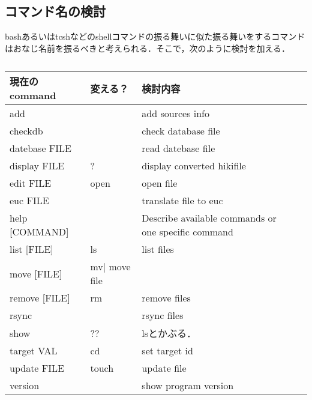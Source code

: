 \subsection{コマンド名の検討}
bashあるいはtcshなどのshellコマンドの振る舞いに似た振る舞いをするコマンドはおなじ名前を振るべきと考えられる．そこで，次のように検討を加える．

\begin{table}[htbp]\begin{center}
\caption{}
\begin{tabular}{llll}
\hline
現在のcommand  &変える？  &検討内容  \\ \hline
add               &  &add sources info  \\
checkdb           &  &check database file  \\
datebase FILE     &  &read datebase file  \\
display FILE      &?  &display converted hikifile  \\
edit FILE         &open  &open file  \\
euc FILE          &  &translate file to euc  \\
help [COMMAND]    &  &Describe available commands or one specific command  \\
list [FILE]       &ls  &list files  \\
move [FILE]       &mv|  move file  \\
remove [FILE]     &rm  &remove files  \\
rsync             &  &rsync files  \\
show              &??  &lsとかぶる．  \\
target VAL        &cd  &set target id  \\
update FILE       &touch  &update file  \\
version           &  &show program version  \\
\hline
\end{tabular}
\label{default}
\end{center}\end{table}

